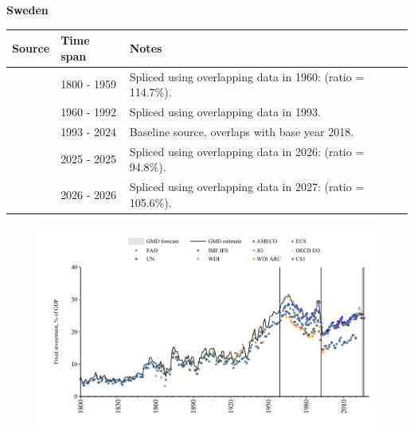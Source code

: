 \documentclass[12pt,a4paper,landscape]{article}
\begin{document}
\begin{adjustbox}{max totalsize={\paperwidth}{\paperheight},center}
\begin{minipage}[t][\textheight][t]{\textwidth}
\vspace*{0.5cm}
{}
\begin{center}
{\Large\bfseries Sweden}
\end{center}
\vspace{0.5cm}
\begin{table}[H]
\centering
\small
\begin{tabular}{|l|l|l|}
\hline
\textbf{Source} & \textbf{Time span} & \textbf{Notes} \\
\hline
\rowcolor{white}\cite{CS1_SWE}& 1800 - 1959 &Spliced using overlapping data in 1960: (ratio = 114.7\%).\\
\rowcolor{lightgray}\cite{WDI}& 1960 - 1992 &Spliced using overlapping data in 1993.\\
\rowcolor{white}\cite{EUS}& 1993 - 2024 &Baseline source, overlaps with base year 2018.\\
\rowcolor{lightgray}\cite{OECD_EO}& 2025 - 2025 &Spliced using overlapping data in 2026: (ratio = 94.8\%).\\
\rowcolor{white}\cite{AMECO}& 2026 - 2026 &Spliced using overlapping data in 2027: (ratio = 105.6\%).\\
\hline
\end{tabular}
\end{table}
\begin{figure}[H]
\centering
\includegraphics[width=\textwidth,height=0.6\textheight,keepaspectratio]{graphs/SWE_finv_GDP.pdf}
\end{figure}
\end{minipage}
\end{adjustbox}
\end{document}
